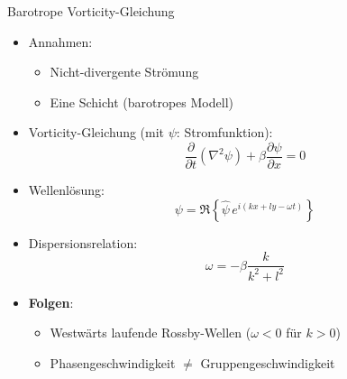             \begin{frame}{Barotrope Vorticity-Gleichung}
                \begin{itemize}
                  \item Annahmen:
                  \begin{itemize}
                    \item Nicht-divergente Strömung
                    \item Eine Schicht (barotropes Modell)
                  \end{itemize}
                  \item Vorticity-Gleichung (mit \(\psi\): Stromfunktion):
                  \[
                    \frac{\partial}{\partial t}(\nabla^2 \psi) + \beta \frac{\partial \psi}{\partial x} = 0
                  \]
                  \item Wellenlösung: 
                  \[
                    \psi = \Re \left\{ \hat{\psi} \, e^{i(kx + ly - \omega t)} \right\}
                  \]
                  \item Dispersionsrelation:
                  \[
                    \omega = -\beta \frac{k}{k^2 + l^2}
                  \]
                  \item \textbf{Folgen}:
                  \begin{itemize}
                    \item Westwärts laufende Rossby-Wellen (\( \omega < 0 \) für \( k > 0 \))
                    \item Phasengeschwindigkeit \( \neq \) Gruppengeschwindigkeit
                  \end{itemize}
                \end{itemize}
                \end{frame}
                